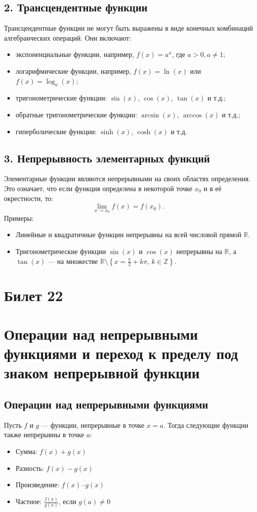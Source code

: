 \documentclass{article}
\begin{document}
\subsection*{2. Трансцендентные функции}
Трансцендентные функции не могут быть выражены в виде конечных комбинаций алгебраических операций. Они включают:
\begin{itemize}
    \item экспоненциальные функции, например, $f(x) = a^x$, где $a > 0, a \neq 1$;
    \item логарифмические функции, например, $f(x) = \ln(x)$ или $f(x) = \log_a(x)$;
    \item тригонометрические функции: $\sin(x)$, $\cos(x)$, $\tan(x)$ и т.д.;
    \item обратные тригонометрические функции: $\arcsin(x)$, $\arccos(x)$ и т.д.;
    \item гиперболические функции: $\sinh(x)$, $\cosh(x)$ и т.д.
\end{itemize}

\subsection*{3. Непрерывность элементарных функций}
Элементарные функции являются непрерывными на своих областях определения. Это означает, что если функция определена в некоторой точке $x_0$ и в её окрестности, то:
\[
\lim_{x \to x_0} f(x) = f(x_0).
\]
Примеры:
\begin{itemize}
    \item Линейные и квадратичные функции непрерывны на всей числовой прямой $\mathbb{R}$.
    \item Тригонометрические функции $\sin(x)$ и $\cos(x)$ непрерывны на $\mathbb{R}$, а $\tan(x)$ — на множестве $\mathbb{R} \setminus \left\{x = \frac{\pi}{2} + k\pi, \, k \in \mathbb{Z}\right\}$.
\end{itemize}



\section{Билет 22}


\section*{Операции над непрерывными функциями и переход к пределу под знаком непрерывной функции}

\subsection*{Операции над непрерывными функциями}
Пусть $f$ и $g$ — функции, непрерывные в точке $x = a$. Тогда следующие функции также непрерывны в точке $a$:
\begin{itemize}
    \item Сумма: $f(x) + g(x)$
    \item Разность: $f(x) - g(x)$
    \item Произведение: $f(x) \cdot g(x)$
    \item Частное: $\frac{f(x)}{g(x)}$, если $g(a) \neq 0$
\end{itemize}
\end{document}

